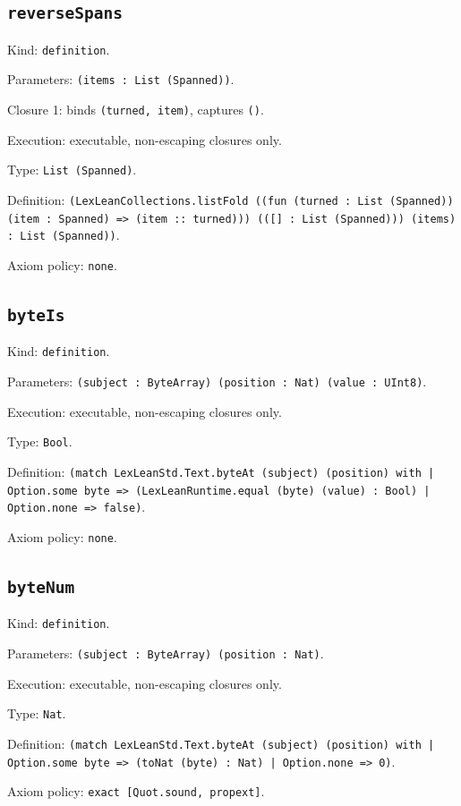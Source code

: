 \documentclass[11pt]{article}
\begin{document}
\subsection*{\texttt{reverseSpans}}
\noindent Kind: \texttt{definition}.\par
\noindent Parameters: \texttt{(items : List (Spanned))}.\par
\noindent Closure 1: binds \texttt{(turned, item)}, captures \texttt{()}.\par
\noindent Execution: executable, non-escaping closures only.\par
\noindent Type: \texttt{List (Spanned)}.\par
\noindent Definition: \texttt{(LexLeanCollections.listFold ((fun (turned : List (Spanned)) (item : Spanned) => (item :: turned))) (([] : List (Spanned))) (items) : List (Spanned))}.\par
\noindent Axiom policy: \texttt{none}.\par
\subsection*{\texttt{byteIs}}
\noindent Kind: \texttt{definition}.\par
\noindent Parameters: \texttt{(subject : ByteArray) (position : Nat) (value : UInt8)}.\par
\noindent Execution: executable, non-escaping closures only.\par
\noindent Type: \texttt{Bool}.\par
\noindent Definition: \texttt{(match LexLeanStd.Text.byteAt (subject) (position) with | Option.some byte => (LexLeanRuntime.equal (byte) (value) : Bool) | Option.none => false)}.\par
\noindent Axiom policy: \texttt{none}.\par
\subsection*{\texttt{byteNum}}
\noindent Kind: \texttt{definition}.\par
\noindent Parameters: \texttt{(subject : ByteArray) (position : Nat)}.\par
\noindent Execution: executable, non-escaping closures only.\par
\noindent Type: \texttt{Nat}.\par
\noindent Definition: \texttt{(match LexLeanStd.Text.byteAt (subject) (position) with | Option.some byte => (toNat (byte) : Nat) | Option.none => 0)}.\par
\noindent Axiom policy: \texttt{exact [Quot.sound, propext]}.\par
\end{document}
